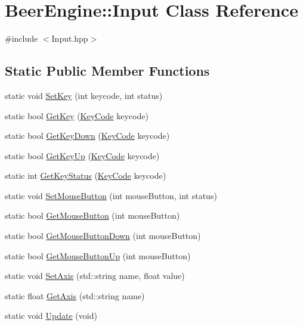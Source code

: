 \hypertarget{class_beer_engine_1_1_input}{}\section{Beer\+Engine\+:\+:Input Class Reference}
\label{class_beer_engine_1_1_input}


{\ttfamily \#include $<$Input.\+hpp$>$}

\subsection*{Static Public Member Functions}
\begin{DoxyCompactItemize}
\item 
static void \mbox{\hyperlink{class_beer_engine_1_1_input_a8c64719adc226a57caf45ce63a0dddee}{Set\+Key}} (int keycode, int status)
\item 
static bool \mbox{\hyperlink{class_beer_engine_1_1_input_aef391d62eeafff68a8b33d232e38c324}{Get\+Key}} (\mbox{\hyperlink{namespace_beer_engine_a94f0b552f6dc910de8cdb44207981f53}{Key\+Code}} keycode)
\item 
static bool \mbox{\hyperlink{class_beer_engine_1_1_input_ab3093c905099025b3dcd0c67dc31ed82}{Get\+Key\+Down}} (\mbox{\hyperlink{namespace_beer_engine_a94f0b552f6dc910de8cdb44207981f53}{Key\+Code}} keycode)
\item 
static bool \mbox{\hyperlink{class_beer_engine_1_1_input_aace9501b3e8bde001dc46dea904504b0}{Get\+Key\+Up}} (\mbox{\hyperlink{namespace_beer_engine_a94f0b552f6dc910de8cdb44207981f53}{Key\+Code}} keycode)
\item 
static int \mbox{\hyperlink{class_beer_engine_1_1_input_a36af1091a677481607d7a197585fd379}{Get\+Key\+Status}} (\mbox{\hyperlink{namespace_beer_engine_a94f0b552f6dc910de8cdb44207981f53}{Key\+Code}} keycode)
\item 
static void \mbox{\hyperlink{class_beer_engine_1_1_input_a8761deb95726518ed5871a38aca6451d}{Set\+Mouse\+Button}} (int mouse\+Button, int status)
\item 
static bool \mbox{\hyperlink{class_beer_engine_1_1_input_a5f1cf046547a086a7f44d7c18ad6776d}{Get\+Mouse\+Button}} (int mouse\+Button)
\item 
static bool \mbox{\hyperlink{class_beer_engine_1_1_input_ad04218c44ce0ef21ed6a5cf65259653f}{Get\+Mouse\+Button\+Down}} (int mouse\+Button)
\item 
static bool \mbox{\hyperlink{class_beer_engine_1_1_input_a82dc5f380752307d5cb5b284488da5ef}{Get\+Mouse\+Button\+Up}} (int mouse\+Button)
\item 
static void \mbox{\hyperlink{class_beer_engine_1_1_input_af7f3c17ce4e2483d03a169894e06851d}{Set\+Axis}} (std\+::string name, float value)
\item 
static float \mbox{\hyperlink{class_beer_engine_1_1_input_ac21c03c4b7d417941034e935af481f2c}{Get\+Axis}} (std\+::string name)
\item 
static void \mbox{\hyperlink{class_beer_engine_1_1_input_a8a5a3a1a4b5fdedf20fc66c40d8e98bb}{Update}} (void)
\end{DoxyCompactItemize}
